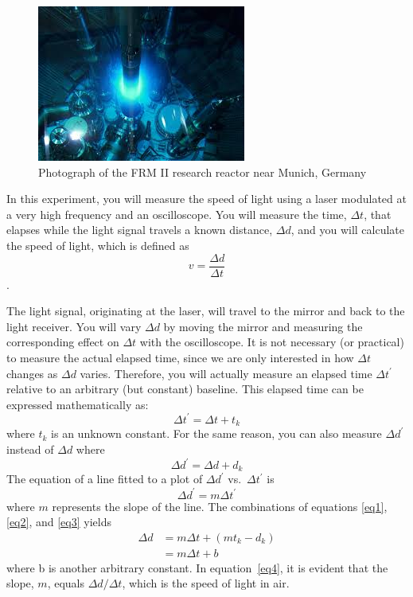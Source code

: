 \documentclass{article}
\begin{document}
\begin{figure}
\centering
\includegraphics{images/cherenkov.jpg}
\caption{Photograph of the FRM II research reactor near Munich, Germany}
\end{figure}


In this experiment, you will measure the speed of light using a laser 
modulated at a very high frequency and an oscilloscope. You will 
measure the time, $\Delta t$, that elapses while the light signal travels a 
known distance, $\Delta d$, and you will calculate the speed of light, which is 
defined as 
\[
v = \frac{\Delta d}{\Delta t}
\]. 

The light signal, originating at the laser, will travel to the mirror and 
back to the light receiver. You will vary $\Delta d$ by moving the mirror and 
measuring the corresponding effect on $\Delta t$ with the oscilloscope.
It is not necessary (or practical) to measure the actual elapsed time, 
since we are only interested in how $\Delta t$ changes as $\Delta d$ varies. 
Therefore, you will actually measure an elapsed time $\Delta t^\prime$ relative to an 
arbitrary (but constant) baseline. This elapsed time can be expressed 
mathematically as:
\begin{equation}
\label{eq1}
\Delta t^\prime = \Delta t + t_k
\end{equation}
where $t_k$ is an unknown constant. For the same reason, you can also 
measure $\Delta d^\prime$ instead of $\Delta d$ where
\begin{equation}
\label{eq2}
\Delta d^\prime = \Delta d + d_k
\end{equation}
The equation of a line fitted to a plot of $\Delta d^\prime$ vs.\ $\Delta t^\prime$ is 
\begin{equation}
\label{eq3}
\Delta d^\prime = m \Delta t^\prime
\end{equation}
where $m$ represents the slope of the line. The combinations of 
equations \ref{eq1}, \ref{eq2}, and \ref{eq3} yields
\begin{align}
\label{eq4}
\Delta d & = m \Delta t + \left( m t_k - d_k \right) \nonumber \\
               & = m \Delta t + b 
\end{align}
where b is another arbitrary constant. In equation~\ref{eq4}, it is evident that 
the slope, $m$, equals $\Delta d/\Delta t$, which is the speed of light in air.
\end{document}
